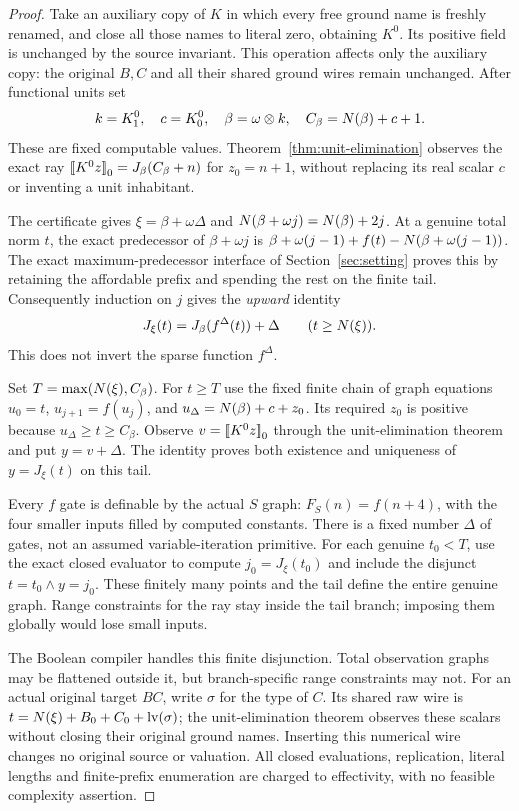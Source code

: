 \begin{proof}
Take an auxiliary copy of $K$ in which every free ground name is freshly
renamed, and close all those names to literal zero, obtaining $K^0$.
Its positive field is unchanged by the source invariant.  This operation
affects only the auxiliary copy: the original $B,C$ and all their shared
ground wires remain unchanged.  After functional units set
\[
 k=K^0_1,\quad c=K^0_0,\quad\beta=\omega\otimes k,\quad
 C_\beta=N(\beta)+c+1.
\]
These are fixed computable values.  Theorem~\ref{thm:unit-elimination}
observes the exact ray $\mathopen{[\![}K^0z\mathclose{]\!]}_0=J_\beta(C_\beta+n)$ for $z_0=n+1$,
without replacing its real scalar $c$ or inventing a unit inhabitant.

The certificate gives $\xi=\beta+\omega\Delta$ and
$N(\beta+\omega j)=N(\beta)+2j$.  At a genuine total norm $t$,
the exact predecessor of $\beta+\omega j$ is
$\beta+\omega(j-1)+f(t)-N(\beta+\omega(j-1))$.
The exact maximum-predecessor interface of Section~\ref{sec:setting} proves this by
retaining the affordable prefix and spending the rest on the finite tail.
Consequently induction on $j$ gives the \emph{upward} identity
\[
 J_\xi(t)=J_\beta(f^\Delta(t))+\Delta
          \qquad(t\ge N(\xi)).
\]
This does not invert the sparse function $f^\Delta$.

Set $T=\max(N(\xi),C_\beta)$.  For $t\ge T$ use the fixed finite
chain of graph equations $u_0=t$, $u_{j+1}=f(u_j)$, and
$u_\Delta=N(\beta)+c+z_0$.  Its required $z_0$ is positive because
$u_\Delta\ge t\ge C_\beta$.  Observe $v=\mathopen{[\![}K^0z\mathclose{]\!]}_0$ through the
unit-elimination theorem and put $y=v+\Delta$.  The identity proves both
existence and uniqueness of $y=J_\xi(t)$ on this tail.

Every $f$ gate is definable by the actual $S$ graph:
$F_S(n)=f(n+4)$, with the four smaller inputs filled by computed
constants.  There is a fixed number $\Delta$ of gates, not an assumed
variable-iteration primitive.  For each genuine $t_0<T$, use the exact
closed evaluator to compute $j_0=J_\xi(t_0)$ and include the disjunct
$t=t_0\wedge y=j_0$.  These finitely many points and the tail define
the entire genuine graph.  Range constraints for the ray stay inside
the tail branch; imposing them globally would lose small inputs.

The Boolean compiler handles this finite disjunction.  Total observation
graphs may be flattened outside it, but branch-specific range constraints
may not.  For an actual original target $BC$, write $\sigma$ for the type
of $C$.  Its shared raw wire is
$t=N(\xi)+B_0+C_0+\operatorname{lv}(\sigma)$; the unit-elimination theorem observes
these scalars without closing their original ground names.  Inserting this
numerical wire changes no original source or valuation.  All closed
evaluations, replication, literal lengths and finite-prefix enumeration
are charged to effectivity, with no feasible complexity assertion.
\end{proof}

